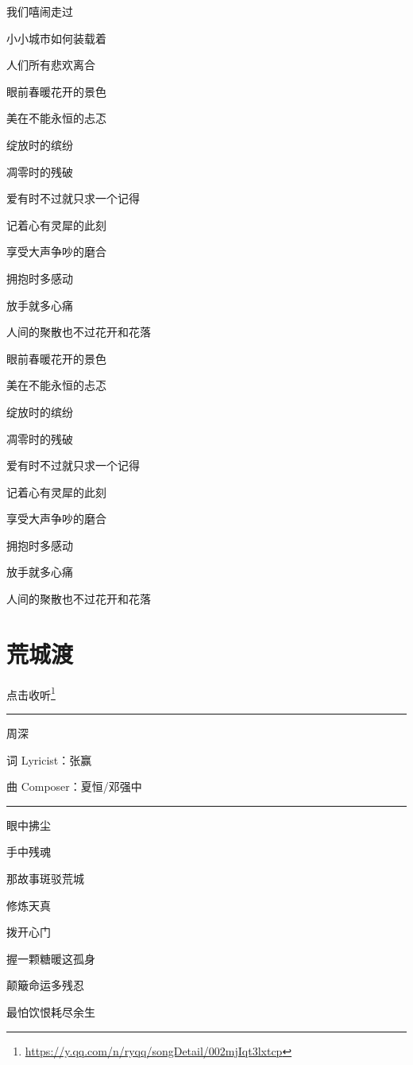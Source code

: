 \documentclass[]{ctexbook}
\renewcommand{\href}[2]{#2\footnote{\url{#1}}}
\begin{document}
我们嘻闹走过

小小城市如何装载着

人们所有悲欢离合

眼前春暖花开的景色

美在不能永恒的忐忑

绽放时的缤纷

凋零时的残破

爱有时不过就只求一个记得

记着心有灵犀的此刻

享受大声争吵的磨合

拥抱时多感动

放手就多心痛

人间的聚散也不过花开和花落

眼前春暖花开的景色

美在不能永恒的忐忑

绽放时的缤纷

凋零时的残破

爱有时不过就只求一个记得

记着心有灵犀的此刻

享受大声争吵的磨合

拥抱时多感动

放手就多心痛

人间的聚散也不过花开和花落

\section*{荒城渡}\label{huangchengdu}


\href{https://y.qq.com/n/ryqq/songDetail/002mjIqt3lxtcp}{点击收听}

\begin{center}\rule{0.5\linewidth}{0.5pt}\end{center}

周深

词 Lyricist：张赢

曲 Composer：夏恒/邓强中

\begin{center}\rule{0.5\linewidth}{0.5pt}\end{center}

眼中拂尘

手中残魂

那故事斑驳荒城

修炼天真

拨开心门

握一颗糖暖这孤身

颠簸命运多残忍

最怕饮恨耗尽余生
\end{document}
